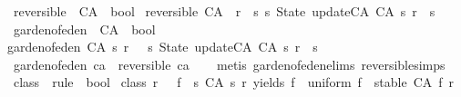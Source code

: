 \begin{isabellebody}
\isanewline
{}\isamarkupfalse%
\ reversible\ {\isacharcolon}{\isacharcolon}\ {\isachardoublequoteopen}CA\ {\isasymRightarrow}\ bool{\isachardoublequoteclose}\ \isanewline
{\isachardoublequoteopen}reversible\ {\isacharparenleft}CA\ {\isacharunderscore}\ r{\isacharparenright}\ {\isacharequal}\ {\isacharparenleft}{\isasymforall}s{\isachardot}\ {\isacharparenleft}{\isasymexists}{\isacharbang}s{}{\isachardot}\ State\ {\isacharparenleft}update{\isacharunderscore}CA\ {\isacharparenleft}CA\ s{}\ r{\isacharparenright}{\isacharparenright}\ {\isacharequal}\ s{\isacharparenright}{\isacharparenright}{\isachardoublequoteclose}\isanewline
\isanewline
{}\isamarkupfalse%
\ garden{\isacharunderscore}of{\isacharunderscore}eden\ {\isacharcolon}{\isacharcolon}\ {\isachardoublequoteopen}CA\ {\isasymRightarrow}\ bool{\isachardoublequoteclose}\ \isanewline
{\isachardoublequoteopen}garden{\isacharunderscore}of{\isacharunderscore}eden\ {\isacharparenleft}CA\ s\ r{\isacharparenright}\ {\isacharequal}\ {\isacharparenleft}{\isasymnot}{\isacharparenleft}{\isasymexists}\ s{}{\isachardot}\ State\ {\isacharparenleft}update{\isacharunderscore}CA\ {\isacharparenleft}CA\ s{}\ r{\isacharparenright}{\isacharparenright}\ {\isacharequal}\ s{\isacharparenright}{\isacharparenright}{\isachardoublequoteclose}\isanewline
\isanewline
{}\isamarkupfalse%
\ {\isachardoublequoteopen}garden{\isacharunderscore}of{\isacharunderscore}eden\ ca\ {\isasymLongrightarrow}\ {\isasymnot}reversible\ ca{\isachardoublequoteclose}\isanewline
%
\isadelimproof
\ \ %
\endisadelimproof
%
\isatagproof
{}\isamarkupfalse%
\ {\isacharparenleft}metis\ garden{\isacharunderscore}of{\isacharunderscore}eden{\isachardot}elims{\isacharparenleft}{}{\isacharparenright}\ reversible{\isachardot}simps{\isacharparenright}%
\endisatagproof
{\isafoldproof}%
%
\isadelimproof
\isanewline
%
\endisadelimproof
\isanewline
\isanewline
{}\isamarkupfalse%
\ class{}\ {\isacharcolon}{\isacharcolon}\ {\isachardoublequoteopen}rule\ {\isasymRightarrow}\ bool{\isachardoublequoteclose}\ \isanewline
{\isachardoublequoteopen}class{}\ r\ {\isasymequiv}\ {\isacharparenleft}{\isasymexists}{\isacharbang}\ f{\isachardot}\ {\isacharparenleft}{\isasymforall}\ s{\isachardot}\ {\isacharparenleft}CA\ s\ r{\isacharparenright}\ yields\ f\ {\isasymand}\ uniform\ f\ {\isasymand}\ stable\ {\isacharparenleft}CA\ f\ r{\isacharparenright}{\isacharparenright}{\isacharparenright}{\isachardoublequoteclose}\isanewline

\end{isabellebody}
